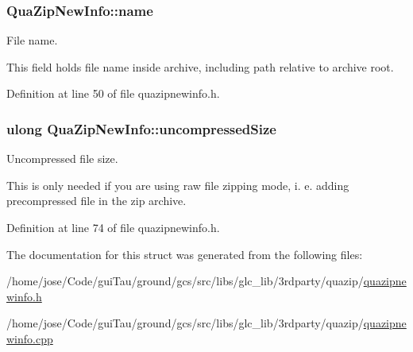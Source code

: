 \hypertarget{struct_qua_zip_new_info_a2bdef01b6ac3326e48598e32bfa5fbe8}{
\subsubsection[{name}]{ Qua\-Zip\-New\-Info\-::name}}\label{struct_qua_zip_new_info_a2bdef01b6ac3326e48598e32bfa5fbe8}


File name. 

This field holds file name inside archive, including path relative to archive root. 

Definition at line 50 of file quazipnewinfo.\-h.

\hypertarget{struct_qua_zip_new_info_a18c079b3f2f5ab6eecdd61d6dbe93be6}{
\subsubsection[{uncompressed\-Size}]{\setlength{\rightskip}{0pt plus 5cm}ulong Qua\-Zip\-New\-Info\-::uncompressed\-Size}}\label{struct_qua_zip_new_info_a18c079b3f2f5ab6eecdd61d6dbe93be6}


Uncompressed file size. 

This is only needed if you are using raw file zipping mode, i. e. adding precompressed file in the zip archive. 

Definition at line 74 of file quazipnewinfo.\-h.



The documentation for this struct was generated from the following files\-:\begin{DoxyCompactItemize}
\item 
/home/jose/\-Code/gui\-Tau/ground/gcs/src/libs/glc\-\_\-lib/3rdparty/quazip/\hyperlink{quazipnewinfo_8h}{quazipnewinfo.\-h}\item 
/home/jose/\-Code/gui\-Tau/ground/gcs/src/libs/glc\-\_\-lib/3rdparty/quazip/\hyperlink{quazipnewinfo_8cpp}{quazipnewinfo.\-cpp}\end{DoxyCompactItemize}
